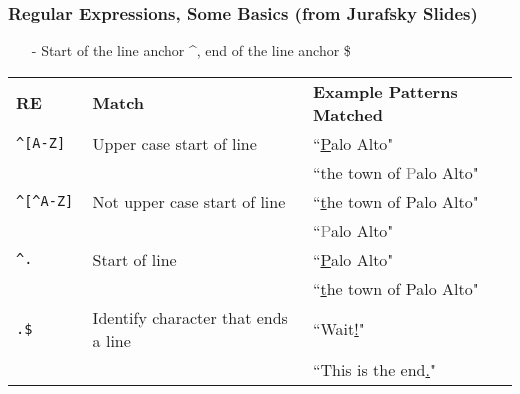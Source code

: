 \documentclass{beamer}
\numberwithin{equation}{section}
\begin{document}
\begin{frame}
\frametitle{Regular Expressions, Some Basics (from Jurafsky Slides) }

\begin{itemize}
\item[-] Start of the line anchor \alert{\^{}}, end of the line anchor \alert{\$}
\end{itemize}


\begin{center}
\begin{tabular}{lll}
\textbf{RE} & \textbf{Match} & \textbf{Example Patterns Matched}\\
{\tt \alert{\^{}}[A-Z] } & Upper case start of line & ``\underline{P}alo Alto" \\
                            &                                                        & ``the town of \textcolor{gray}{P}alo Alto" \\
{\tt \alert{\^{}}[\^{}A-Z] } & Not upper case start of line &      ``\underline{t}he town of Palo Alto" \\
                            &                                                        & ``\textcolor{gray}{P}alo Alto" \\
{\tt \alert{\^{}}.} & Start of line  & ``\underline{P}alo Alto" \\
                            &                                                        & ``\underline{t}he town of Palo Alto" \\
{\tt .\alert{\$} }      & Identify character that ends a line &    ``Wait\alert{\underline{!}}" \\
                              &                                                & ``This is the end\alert{\underline{.}}" \\

 \end{tabular}
 \end{center}


\end{frame}
\end{document}
